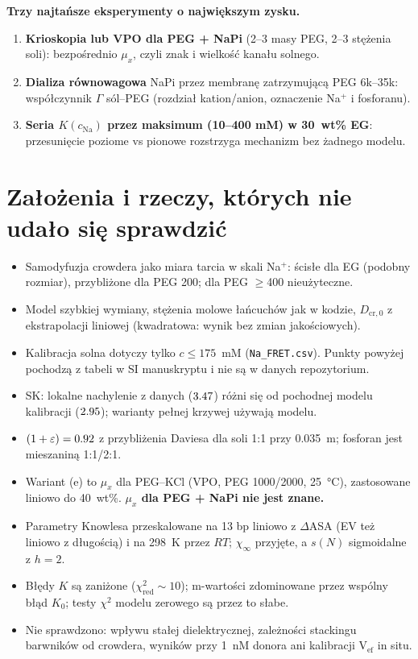 \documentclass[10pt,a4paper]{article}
\begin{document}
\textbf{Trzy najtańsze eksperymenty o największym zysku.}
\begin{enumerate}\itemsep1pt
\item \textbf{Krioskopia lub VPO dla PEG + NaPi} (2--3 masy PEG, 2--3 stężenia soli): bezpośrednio $\mu_x$, czyli znak i wielkość kanału solnego.
\item \textbf{Dializa równowagowa} NaPi przez membranę zatrzymującą PEG 6k--35k: współczynnik $\Gamma$ sól--PEG (rozdział kation/anion, oznaczenie Na$^+$ i fosforanu).
\item \textbf{Seria $K(c_\mathrm{Na})$ przez maksimum (10--400 mM) w 30~wt\% EG}: przesunięcie poziome vs pionowe rozstrzyga mechanizm bez żadnego modelu.
\end{enumerate}

\section{Założenia i rzeczy, których nie udało się sprawdzić}
\begin{itemize}\itemsep1pt
\item Samodyfuzja crowdera jako miara tarcia w skali Na$^+$: ścisłe dla EG (podobny rozmiar), przybliżone dla PEG 200; dla PEG $\geq$400 nieużyteczne.
\item Model szybkiej wymiany, stężenia molowe łańcuchów jak w kodzie, $D_\mathrm{cr,0}$ z ekstrapolacji liniowej (kwadratowa: wynik bez zmian jakościowych).
\item Kalibracja solna dotyczy tylko $c\leq175$~mM (\texttt{Na\_FRET.csv}). Punkty powyżej pochodzą z tabeli w SI manuskryptu i nie są w danych repozytorium.
\item SK: lokalne nachylenie z danych ($3.47$) różni się od pochodnej modelu kalibracji ($2.95$); warianty pełnej krzywej używają modelu.
\item $(1+\varepsilon)=0.92$ z przybliżenia Daviesa dla soli 1:1 przy 0.035~m; fosforan jest mieszaniną 1:1/2:1.
\item Wariant (e) to $\mu_x$ dla PEG--KCl (VPO, PEG 1000/2000, 25~°C), zastosowane liniowo do 40~wt\%. \textbf{$\mu_x$ dla PEG + NaPi nie jest znane.}
\item Parametry Knowlesa przeskalowane na 13 bp liniowo z $\Delta$ASA (EV też liniowo z długością) i na 298~K przez $RT$; $\chi_\infty$ przyjęte, a $s(N)$ sigmoidalne z $h=2$.
\item Błędy $K$ są zaniżone ($\chi^2_\mathrm{red}\sim10$); m-wartości zdominowane przez wspólny błąd $K_0$; testy $\chi^2$ modelu zerowego są przez to słabe.
\item Nie sprawdzono: wpływu stałej dielektrycznej, zależności stackingu barwników od crowdera, wyników przy 1~nM donora ani kalibracji V$_\mathrm{ef}$ in situ.
\end{itemize}
\end{document}
